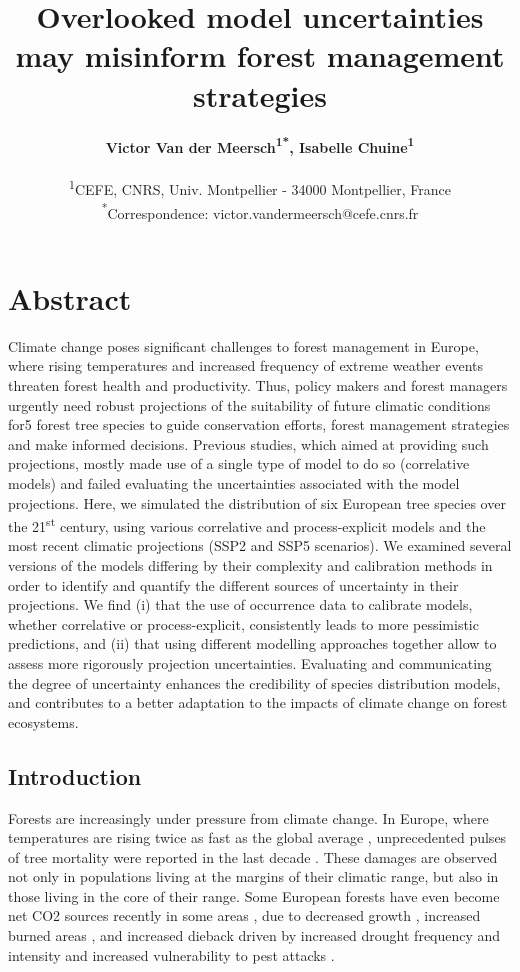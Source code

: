 \documentclass[letterpaper,8pt]{article}  %
\title{Overlooked model uncertainties may misinform forest management strategies}
\author{%
\textbf{Victor Van der Meersch\textcolor{Accent}{\textsuperscript{1*}}, %
Isabelle Chuine\textcolor{Accent}{\textsuperscript{1}} %
}\\
\begin{small}\textcolor{Accent}{\textsuperscript{1}}CEFE, CNRS, Univ. Montpellier - 34000 Montpellier, France \\ 
\textcolor{Accent}{\textsuperscript{*}}Correspondence: \textcolor{Accent}{victor.vandermeersch@cefe.cnrs.fr} \\ \end{small}
}
\date{}
\begin{document}
\maketitle

\section*{Abstract}

\begin{doublespacing}
\begin{linenumbers}

Climate change poses significant challenges to forest management in Europe, where rising temperatures and increased frequency of extreme weather events threaten forest health and productivity. Thus, policy makers and forest managers urgently need robust projections of the suitability of future climatic conditions for5 forest tree species to guide conservation efforts, forest management strategies and make informed decisions. Previous studies, which aimed at providing such projections, mostly made use of a single type of model to do so (correlative models) and failed evaluating the uncertainties associated with the model projections. Here, we simulated the distribution of six European tree species over the 21\textsuperscript{st} century, using various correlative and process-explicit models and the most recent climatic projections (SSP2 and SSP5 scenarios). We examined several versions of the models differing by their complexity and calibration methods in order to identify and quantify the different sources of uncertainty in their projections. We find (i) that the use of occurrence data to calibrate models, whether correlative or process-explicit, consistently leads to more pessimistic predictions, and (ii) that using different modelling approaches together allow to assess more rigorously projection uncertainties. Evaluating and communicating the degree of uncertainty enhances the credibility of species distribution models, and contributes to a better adaptation to the impacts of climate change on forest ecosystems.

\rmfamily


\subsection{Introduction}

Forests are increasingly under pressure from climate change. In Europe, where temperatures are rising twice as fast as the global average \citep{CCCS2024}, unprecedented pulses of tree mortality were reported in the last decade \citep{Senf2020}. These damages are observed not only in populations living at the margins of their climatic range, but also in those living in the core of their range. Some European forests have even become net CO2 sources recently  in some areas \citep{Hadden2016, Karelin2021}, due to decreased growth \citep{Hadden2016, Woude2023}, increased burned areas \citep{Carnicer2022, Kelly2024}, and increased dieback driven by increased drought frequency and intensity and increased vulnerability to pest attacks \citep{Karelin2021, Cienciala2024, Latifovic2024}.


\end{linenumbers}
\end{doublespacing}
\end{document}
